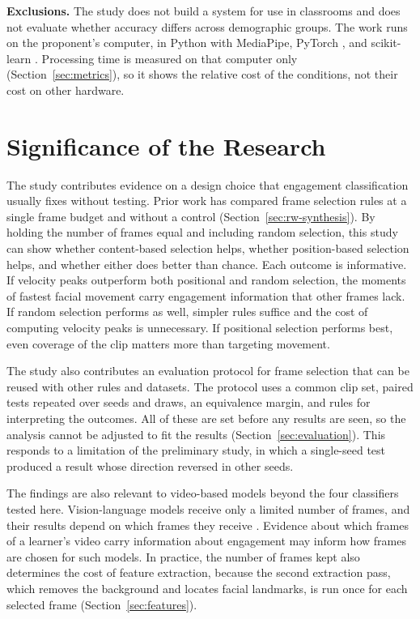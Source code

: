 \textbf{Exclusions.} The study does not build a system for use in classrooms and does not evaluate whether accuracy differs across demographic groups. The work runs on the proponent's computer, in Python with MediaPipe, PyTorch \cite{paszke2019}, and scikit-learn \cite{pedregosa2011}. Processing time is measured on that computer only (Section~\ref{sec:metrics}), so it shows the relative cost of the conditions, not their cost on other hardware.



\section{Significance of the Research}
\label{sec:significance}

The study contributes evidence on a design choice that engagement classification usually fixes without testing. Prior work has compared frame selection rules at a single frame budget and without a control (Section~\ref{sec:rw-synthesis}). By holding the number of frames equal and including random selection, this study can show whether content-based selection helps, whether position-based selection helps, and whether either does better than chance. Each outcome is informative. If velocity peaks outperform both positional and random selection, the moments of fastest facial movement carry engagement information that other frames lack. If random selection performs as well, simpler rules suffice and the cost of computing velocity peaks is unnecessary. If positional selection performs best, even coverage of the clip matters more than targeting movement.

The study also contributes an evaluation protocol for frame selection that can be reused with other rules and datasets. The protocol uses a common clip set, paired tests repeated over seeds and draws, an equivalence margin, and rules for interpreting the outcomes. All of these are set before any results are seen, so the analysis cannot be adjusted to fit the results (Section~\ref{sec:evaluation}). This responds to a limitation of the preliminary study, in which a single-seed test produced a result whose direction reversed in other seeds.

The findings are also relevant to video-based models beyond the four classifiers tested here. Vision-language models receive only a limited number of frames, and their results depend on which frames they receive \cite{brkic2025,tang2025aks}. Evidence about which frames of a learner's video carry information about engagement may inform how frames are chosen for such models. In practice, the number of frames kept also determines the cost of feature extraction, because the second extraction pass, which removes the background and locates facial landmarks, is run once for each selected frame (Section~\ref{sec:features}).

